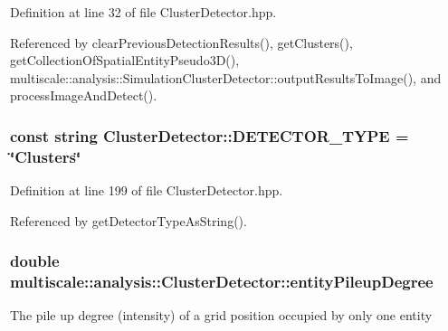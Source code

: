 \-Definition at line 32 of file \-Cluster\-Detector.\-hpp.



\-Referenced by clear\-Previous\-Detection\-Results(), get\-Clusters(), get\-Collection\-Of\-Spatial\-Entity\-Pseudo3\-D(), multiscale\-::analysis\-::\-Simulation\-Cluster\-Detector\-::output\-Results\-To\-Image(), and process\-Image\-And\-Detect().

\hypertarget{classmultiscale_1_1analysis_1_1ClusterDetector_ae2eae436968e6f637208af7d5a9d93b1}{
\subsubsection[{\-D\-E\-T\-E\-C\-T\-O\-R\-\_\-\-T\-Y\-P\-E}]{\setlength{\rightskip}{0pt plus 5cm}const string {\bf \-Cluster\-Detector\-::\-D\-E\-T\-E\-C\-T\-O\-R\-\_\-\-T\-Y\-P\-E} = \char`\"{}\-Clusters\char`\"{}}}\label{classmultiscale_1_1analysis_1_1ClusterDetector_ae2eae436968e6f637208af7d5a9d93b1}


\-Definition at line 199 of file \-Cluster\-Detector.\-hpp.



\-Referenced by get\-Detector\-Type\-As\-String().

\hypertarget{classmultiscale_1_1analysis_1_1ClusterDetector_aaa93a4b3a5a3c4279aa434669093ac40}{
\subsubsection[{entity\-Pileup\-Degree}]{\setlength{\rightskip}{0pt plus 5cm}double {\bf multiscale\-::analysis\-::\-Cluster\-Detector\-::entity\-Pileup\-Degree}}}\label{classmultiscale_1_1analysis_1_1ClusterDetector_aaa93a4b3a5a3c4279aa434669093ac40}
\-The pile up degree (intensity) of a grid position occupied by only one entity 

